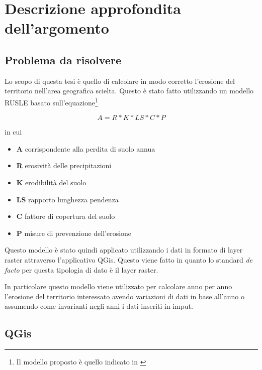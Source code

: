 
\chapter{Descrizione approfondita dell'argomento}
\label{cap:descrizione}
\section{Problema da risolvere} Lo scopo di questa tesi è quello di calcolare in
modo corretto l'erosione del territorio nell'area geografica scielta.
Questo è stato fatto utilizzando un modello RUSLE basato sull'equazione\footnote{Il
modello proposto è quello indicato in \cite[p.~37]{tesi:ambientale}}

\begin{equation}\label{eq:main}
A = R * K * LS * C * P
\end{equation}

in cui
\begin{itemize}
\item \textbf{A} corrispondente alla perdita di suolo annua
\item \textbf{R} erosività delle precipitazioni
\item \textbf{K} erodibilità del suolo
\item \textbf{LS} rapporto lunghezza pendenza
\item \textbf{C} fattore di copertura del suolo
\item \textbf{P} misure di prevenzione dell'erosione
\end{itemize}

Questo modello è stato quindi applicato utilizzando i dati in formato di layer raster attraverso l'applicativo QGis.
Questo viene fatto in quanto lo standard \textit{de facto} per questa tipologia di dato è il layer raster.


In particolare questo modello viene utilizzato per calcolare anno per anno l'erosione del territorio interessato avendo variazioni di dati in base all'anno o assumendo come invarianti negli anni i dati inseriti in imput.

\section{QGis}

